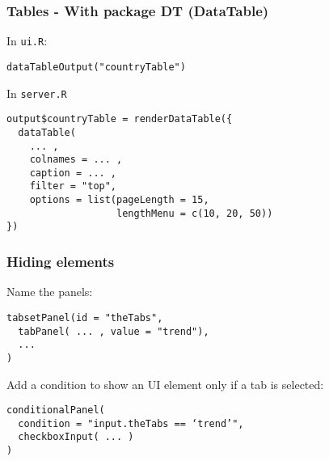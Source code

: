 \documentclass{beamer}
\begin{document}
	\begin{frame}[fragile]
		\frametitle{Tables - With package DT (DataTable)}
		
		In \verb|ui.R|:
		\begin{exampleblock}{}
		\begin{BVerbatim}
dataTableOutput("countryTable")
		\end{BVerbatim}
		\end{exampleblock}{}

		\vspace{1em}

		In \verb|server.R|
		\begin{exampleblock}{}
		\begin{BVerbatim}
output$countryTable = renderDataTable({
  dataTable(
    ... ,
    colnames = ... ,
    caption = ... ,
    filter = "top",
    options = list(pageLength = 15,
                   lengthMenu = c(10, 20, 50))
})
		\end{BVerbatim}
		\end{exampleblock}{}

	\end{frame}

	\begin{frame}[fragile]
		\frametitle{Hiding elements}
		
		Name the panels:
		\begin{exampleblock}{}
		\begin{BVerbatim}
tabsetPanel(id = "theTabs",
  tabPanel( ... , value = "trend"),
  ...
)
		\end{BVerbatim}
		\end{exampleblock}{}

		\vspace{1em}

		Add a condition to show an UI element only if a tab is selected:
		\begin{exampleblock}{}
		\begin{BVerbatim}
conditionalPanel(
  condition = "input.theTabs == ‘trend’",
  checkboxInput( ... )
)
		\end{BVerbatim}
		\end{exampleblock}{}

	\end{frame}
\end{document}
